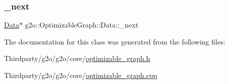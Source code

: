 \subsubsection{\texorpdfstring{\+\_\+next}{\_next}}
{\footnotesize\ttfamily \mbox{\hyperlink{classg2o_1_1_optimizable_graph_1_1_data}{Data}}$\ast$ g2o\+::\+Optimizable\+Graph\+::\+Data\+::\+\_\+next\hspace{0.3cm}{\ttfamily [protected]}}



The documentation for this class was generated from the following files\+:\begin{DoxyCompactItemize}
\item 
Thirdparty/g2o/g2o/core/\mbox{\hyperlink{optimizable__graph_8h}{optimizable\+\_\+graph.\+h}}\item 
Thirdparty/g2o/g2o/core/\mbox{\hyperlink{optimizable__graph_8cpp}{optimizable\+\_\+graph.\+cpp}}\end{DoxyCompactItemize}
